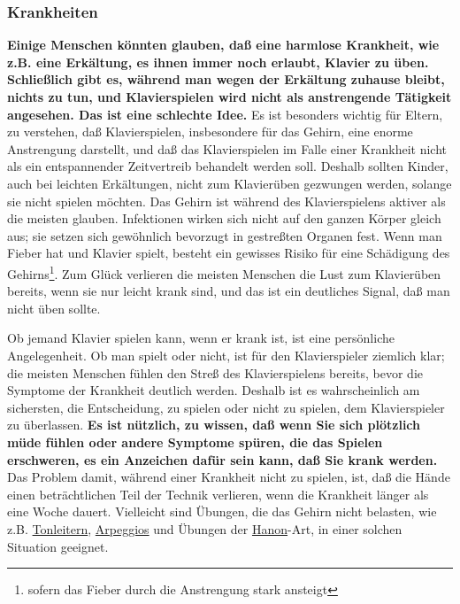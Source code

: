 \subsubsection{Krankheiten}
\label{c1iii10krank}

\textbf{Einige Menschen könnten glauben, daß eine harmlose Krankheit, wie z.B. eine Erkältung, es ihnen immer noch erlaubt, Klavier zu üben.
Schließlich gibt es, während man wegen der Erkältung zuhause bleibt, nichts zu tun, und Klavierspielen wird nicht als anstrengende Tätigkeit angesehen.
Das ist eine schlechte Idee.}
Es ist besonders wichtig für Eltern, zu verstehen, daß Klavierspielen, insbesondere für das Gehirn, eine enorme Anstrengung darstellt, und daß das Klavierspielen im Falle einer Krankheit nicht als ein entspannender Zeitvertreib behandelt werden soll.
Deshalb sollten Kinder, auch bei leichten Erkältungen, nicht zum Klavierüben gezwungen werden, solange sie nicht spielen möchten.
Das Gehirn ist während des Klavierspielens aktiver als die meisten glauben.
Infektionen wirken sich nicht auf den ganzen Körper gleich aus; sie setzen sich gewöhnlich bevorzugt in gestreßten Organen fest.
Wenn man Fieber hat und Klavier spielt, besteht ein gewisses Risiko für eine Schädigung des Gehirns\footnote{sofern das Fieber durch die Anstrengung stark ansteigt}.
Zum Glück verlieren die meisten Menschen die Lust zum Klavierüben bereits, wenn sie nur leicht krank sind, und das ist ein deutliches Signal, daß man nicht üben sollte.

Ob jemand Klavier spielen kann, wenn er krank ist, ist eine persönliche Angelegenheit.
Ob man spielt oder nicht, ist für den Klavierspieler ziemlich klar; die meisten Menschen fühlen den Streß des Klavierspielens bereits, bevor die Symptome der Krankheit deutlich werden.
Deshalb ist es wahrscheinlich am sichersten, die Entscheidung, zu spielen oder nicht zu spielen, dem Klavierspieler zu überlassen.
\textbf{Es ist nützlich, zu wissen, daß wenn Sie sich plötzlich müde fühlen oder andere Symptome spüren, die das Spielen erschweren, es ein Anzeichen dafür sein kann, daß Sie krank werden.}
Das Problem damit, während einer Krankheit nicht zu spielen, ist, daß die Hände einen beträchtlichen Teil der Technik verlieren, wenn die Krankheit länger als eine Woche dauert.
Vielleicht sind Übungen, die das Gehirn nicht belasten, wie z.B. \hyperref[c1iii5]{Tonleitern}, \hyperref[Arpeggios]{Arpeggios} und Übungen der \hyperref[c1iii7h]{Hanon}-Art, in einer solchen Situation geeignet.
 

